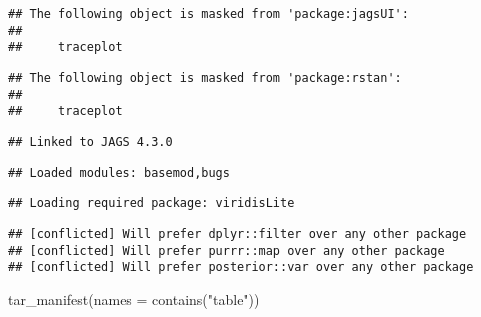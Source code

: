 \documentclass[
]{article}
\newenvironment{Shaded}{\begin{snugshade}}{\end{snugshade}}
\newcommand{\AttributeTok}[1]{\textcolor[rgb]{0.77,0.63,0.00}{#1}}
\newcommand{\FunctionTok}[1]{\textcolor[rgb]{0.00,0.00,0.00}{#1}}
\newcommand{\NormalTok}[1]{#1}
\newcommand{\StringTok}[1]{\textcolor[rgb]{0.31,0.60,0.02}{#1}}
\begin{document}
\begin{verbatim}
## The following object is masked from 'package:jagsUI':
## 
##     traceplot
\end{verbatim}

\begin{verbatim}
## The following object is masked from 'package:rstan':
## 
##     traceplot
\end{verbatim}

\begin{verbatim}
## Linked to JAGS 4.3.0
\end{verbatim}

\begin{verbatim}
## Loaded modules: basemod,bugs
\end{verbatim}

\begin{verbatim}
## Loading required package: viridisLite
\end{verbatim}

\begin{verbatim}
## [conflicted] Will prefer dplyr::filter over any other package
## [conflicted] Will prefer purrr::map over any other package
## [conflicted] Will prefer posterior::var over any other package
\end{verbatim}

\begin{Shaded}
\begin{Highlighting}[]
\FunctionTok{tar\_manifest}\NormalTok{(}\AttributeTok{names =} \FunctionTok{contains}\NormalTok{(}\StringTok{"table"}\NormalTok{))}
\end{Highlighting}
\end{Shaded}
\end{document}

